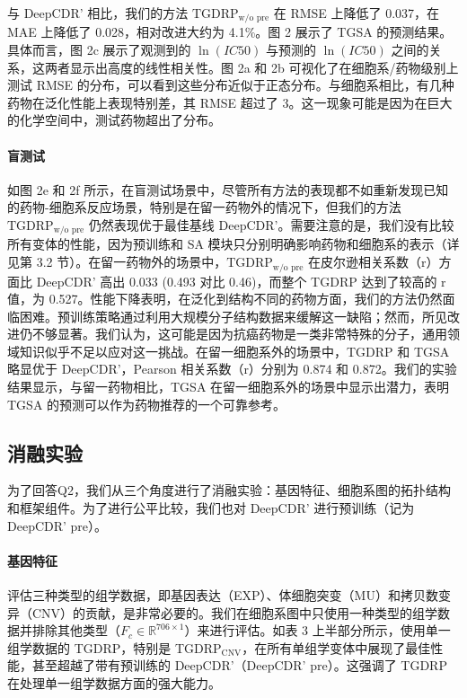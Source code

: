 与 DeepCDR' 相比，我们的方法 $ \text{TGDRP}_{\text{w/o pre}} $ 在 RMSE 上降低了 0.037，在 MAE 上降低了 0.028，相对改进大约为 4.1\%。图 2 展示了 TGSA 的预测结果。具体而言，图 2c 展示了观测到的 \(\ln(IC50)\) 与预测的 \(\ln(IC50)\) 之间的关系，这两者显示出高度的线性相关性。图 2a 和 2b 可视化了在细胞系/药物级别上测试 RMSE 的分布，可以看到这些分布近似于正态分布。与细胞系相比，有几种药物在泛化性能上表现特别差，其 RMSE 超过了 3。这一现象可能是因为在巨大的化学空间中，测试药物超出了分布。

\paragraph{盲测试}
如图 2e 和 2f 所示，在盲测试场景中，尽管所有方法的表现都不如重新发现已知的药物-细胞系反应场景，特别是在留一药物外的情况下，但我们的方法 $ \text{TGDRP}_{\text{w/o pre}} $ 仍然表现优于最佳基线 DeepCDR'。需要注意的是，我们没有比较所有变体的性能，因为预训练和 SA 模块只分别明确影响药物和细胞系的表示（详见第 3.2 节）。在留一药物外的场景中，$ \text{TGDRP}_{\text{w/o pre}} $ 在皮尔逊相关系数（r）方面比 DeepCDR' 高出 0.033 (0.493 对比 0.46)，而整个 TGDRP 达到了较高的 r 值，为 0.527。性能下降表明，在泛化到结构不同的药物方面，我们的方法仍然面临困难。预训练策略通过利用大规模分子结构数据来缓解这一缺陷；然而，所见改进仍不够显著。我们认为，这可能是因为抗癌药物是一类非常特殊的分子，通用领域知识似乎不足以应对这一挑战。在留一细胞系外的场景中，TGDRP 和 TGSA 略显优于 DeepCDR'，Pearson 相关系数（r）分别为 0.874 和 0.872。我们的实验结果显示，与留一药物相比，TGSA 在留一细胞系外的场景中显示出潜力，表明 TGSA 的预测可以作为药物推荐的一个可靠参考。

\subsection{消融实验}
为了回答Q2，我们从三个角度进行了消融实验：基因特征、细胞系图的拓扑结构和框架组件。为了进行公平比较，我们也对 DeepCDR' 进行预训练（记为 DeepCDR' pre）。

\paragraph{基因特征}
评估三种类型的组学数据，即基因表达（EXP）、体细胞突变（MU）和拷贝数变异（CNV）的贡献，是非常必要的。我们在细胞系图中只使用一种类型的组学数据并排除其他类型（\( F_c \in \mathbb{R}^{706 \times 1} \)）来进行评估。如表 3 上半部分所示，使用单一组学数据的 TGDRP，特别是 TGDRP\(_{\text{CNV}}\)，在所有单组学变体中展现了最佳性能，甚至超越了带有预训练的 DeepCDR'（DeepCDR' pre）。这强调了 TGDRP 在处理单一组学数据方面的强大能力。

